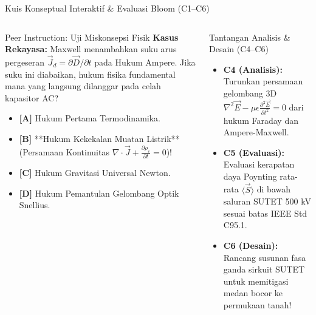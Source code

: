 \documentclass[aspectratio=169,10pt]{beamer}
\begin{document}
\begin{frame}{Kuis Konseptual Interaktif \& Evaluasi Bloom (C1--C6)}
  \begin{columns}[t]
    \begin{alertblock}{Peer Instruction: Uji Miskonsepsi Fisik}
      \footnotesize
      \textbf{Kasus Rekayasa:} Maxwell menambahkan suku arus pergeseran $\vec{J}_d = \partial\vec{D}/\partial t$ pada Hukum Ampere. Jika suku ini diabaikan, hukum fisika fundamental mana yang langsung dilanggar pada celah kapasitor AC?
      \vspace{0.05cm}
      \begin{itemize}\setlength{\itemsep}{1pt}
        \item \textbf{[A]} Hukum Pertama Termodinamika.
        \item \textbf{[B]} **Hukum Kekekalan Muatan Listrik** (Persamaan Kontinuitas $\nabla \cdot \vec{J} + \frac{\partial \rho_v}{\partial t} = 0$)!
        \item \textbf{[C]} Hukum Gravitasi Universal Newton.
        \item \textbf{[D]} Hukum Pemantulan Gelombang Optik Snellius.
      \end{itemize}
    \end{alertblock}

    \begin{block}{Tantangan Analisis \& Desain (C4--C6)}
      \footnotesize
      \begin{itemize}\setlength{\itemsep}{2pt}
        \item \textbf{C4 (Analisis):} Turunkan persamaan gelombang 3D $\nabla^2 \vec{E} - \mu\epsilon \frac{\partial^2 \vec{E}}{\partial t^2} = 0$ dari hukum Faraday dan Ampere-Maxwell.
        \item \textbf{C5 (Evaluasi):} Evaluasi kerapatan daya Poynting rata-rata $\langle \vec{S} \rangle$ di bawah saluran SUTET 500 kV sesuai batas IEEE Std C95.1.
        \item \textbf{C6 (Desain):} Rancang susunan fasa ganda sirkuit SUTET untuk memitigasi medan bocor ke permukaan tanah!
      \end{itemize}
    \end{block}
  \end{columns}
\end{frame}
\end{document}
